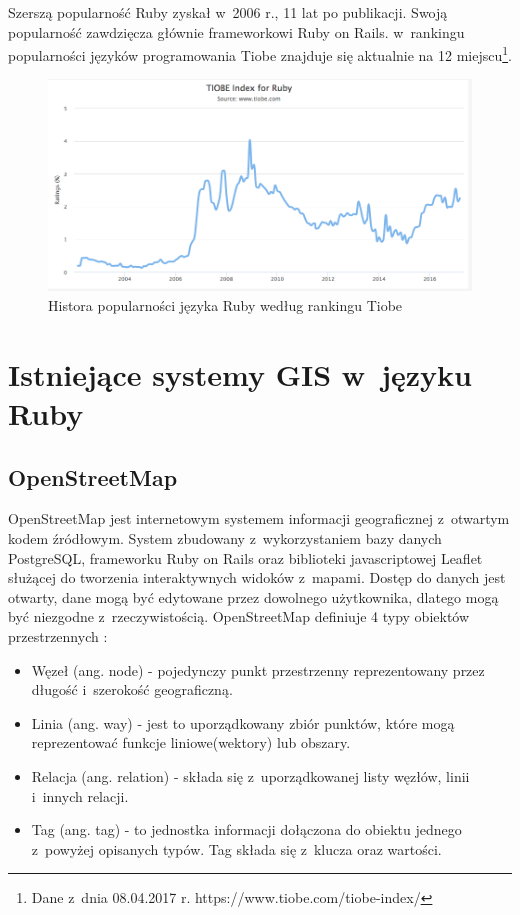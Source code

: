 \documentclass[printmode]{mgr}
\begin{document}
Szerszą popularność Ruby zyskał w~2006 r., 11 lat po publikacji. Swoją popularność zawdzięcza głównie frameworkowi Ruby on Rails. w~rankingu popularności języków programowania Tiobe znajduje się aktualnie na 12 miejscu\footnote{Dane z~dnia 08.04.2017 r. https://www.tiobe.com/tiobe-index/}.

\begin{figure}[H]
  \centering
  \includegraphics[width=1\linewidth]{pictures/ruby_tiobe}
  \caption{Histora popularności języka Ruby według rankingu Tiobe}
  \label{fig:ruby_tiobe}
\end{figure}

\chapter{Istniejące systemy GIS w~języku Ruby}

\section{OpenStreetMap}

  OpenStreetMap jest internetowym systemem informacji geograficznej z~otwartym kodem źródłowym. System zbudowany z~wykorzystaniem bazy danych PostgreSQL, frameworku Ruby on Rails oraz biblioteki javascriptowej Leaflet służącej do tworzenia interaktywnych widoków z~mapami. Dostęp do danych jest otwarty, dane mogą być edytowane przez dowolnego użytkownika, dlatego mogą być niezgodne z~rzeczywistością. OpenStreetMap definiuje 4 typy obiektów przestrzennych \cite{doc_osm}:
  \begin{itemize}
    \item Węzeł (ang. node) - pojedynczy punkt przestrzenny reprezentowany przez długość i~szerokość geograficzną.
    \item Linia (ang. way) - jest to uporządkowany zbiór punktów, które mogą reprezentować funkcje liniowe(wektory) lub obszary.
    \item Relacja (ang. relation) - składa się z~uporządkowanej listy węzłów, linii i~innych relacji.
    \item Tag (ang. tag) - to jednostka informacji dołączona do obiektu jednego z~powyżej opisanych typów. Tag składa się z~klucza oraz wartości. 
  \end{itemize}
\end{document}
